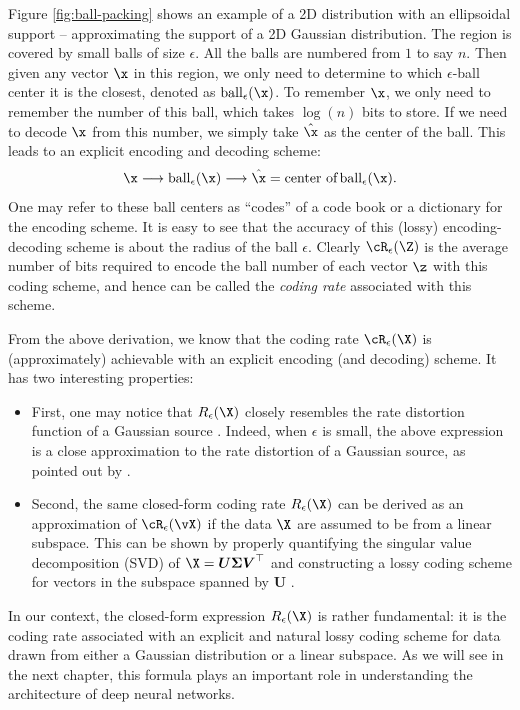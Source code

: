 \documentclass[../../book-main.tex]{subfiles}
\begin{document}
\begin{example}
	Figure \ref{fig:ball-packing} shows an example of a 2D distribution with an ellipsoidal support -- approximating the support of a 2D Gaussian distribution. The region is covered by small balls of size $\epsilon$. All the balls are numbered from $1$ to say $n$. Then given any vector $\x$ in this region, we
	only need to determine to which $\epsilon$-ball center it is the closest, denoted as $\operatorname{ball}_{\epsilon}(\x)$. To remember $\x$, we only need to remember the number of this ball, which takes $\log(n)$ bits to store. If we need to decode $\x$ from this number, we simply take $\hat \x$ as the center of the ball. This leads to an explicit encoding and decoding scheme:
	\begin{equation}
		\x \longrightarrow \operatorname{ball}_{\epsilon}(\x) \longrightarrow \hat \x = \mbox{center of} \operatorname{ball}_{\epsilon}(\x).
	\end{equation}
	One may refer to these ball centers as  ``codes'' of a code book or a dictionary for the encoding scheme. It is easy to see that the accuracy of this (lossy) encoding-decoding scheme is about the radius of the ball $\epsilon$. 
	Clearly $\cR_{\epsilon}(\Z)$ is the average
	number of bits required to encode the ball number of each vector $\z$ with
	this coding scheme, and hence can be called the {\em coding rate} associated with this scheme.
\end{example}


From the above derivation, we know that the coding rate $\cR_{\epsilon}(\X)$ is (approximately) achievable with an explicit encoding (and decoding) scheme. It has two interesting  properties:
\begin{itemize}
	\item First, one may notice that $R_{\epsilon}(\X)$ closely resembles the rate distortion function of a Gaussian source \cite{Cover-Thomas}. Indeed, when $\epsilon$ is small, the above expression is a close approximation to the rate distortion of a Gaussian source, as pointed out by   \cite{MaY2007-PAMI}.
	\item Second, the same closed-form coding rate $R_{\epsilon}(\X)$ can be derived as an approximation of \(\cR_{\epsilon}(\vX)\) if the data $\X$ are assumed to be from a linear subspace. This can be shown by properly quantifying the singular value decomposition (SVD) of $\X = \boldsymbol{U} \boldsymbol{\Sigma}\boldsymbol{V}^\top$ and constructing a lossy coding scheme for vectors in the subspace spanned by $\boldsymbol{U}$ \cite{MaY2007-PAMI}.
\end{itemize}
In our context, the closed-form expression $R_{\epsilon}(\X)$ is rather fundamental: it is the coding rate associated with an explicit and natural lossy coding scheme for data drawn from either a Gaussian distribution or a linear subspace. As we will see in the next chapter, this formula plays an important role in understanding the architecture of deep neural networks.
\end{document}
